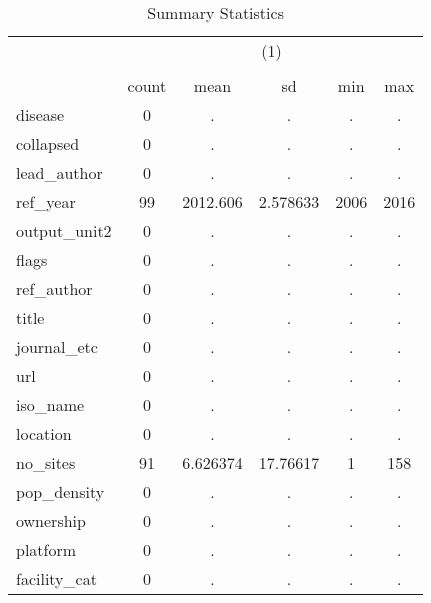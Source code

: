 \begin{table}[htbp]\centering
\def\sym#1{\ifmmode^{#1}\else\(^{#1}\)\fi}
\caption{Summary Statistics}
\begin{tabular}{l*{1}{ccccc}}
\hline\hline
            &\multicolumn{5}{c}{(1)}                                         \\
            &\multicolumn{5}{c}{}                                            \\
            &       count&        mean&          sd&         min&         max\\
\hline
disease     &           0&           .&           .&           .&           .\\
collapsed   &           0&           .&           .&           .&           .\\
lead\_author &           0&           .&           .&           .&           .\\
ref\_year    &          99&    2012.606&    2.578633&        2006&        2016\\
output\_unit2&           0&           .&           .&           .&           .\\
flags       &           0&           .&           .&           .&           .\\
ref\_author  &           0&           .&           .&           .&           .\\
title       &           0&           .&           .&           .&           .\\
journal\_etc &           0&           .&           .&           .&           .\\
url         &           0&           .&           .&           .&           .\\
iso\_name    &           0&           .&           .&           .&           .\\
location    &           0&           .&           .&           .&           .\\
no\_sites    &          91&    6.626374&    17.76617&           1&         158\\
pop\_density &           0&           .&           .&           .&           .\\
ownership   &           0&           .&           .&           .&           .\\
platform    &           0&           .&           .&           .&           .\\
facility\_cat&           0&           .&           .&           .&           .\\

\end{tabular}
\end{table}
